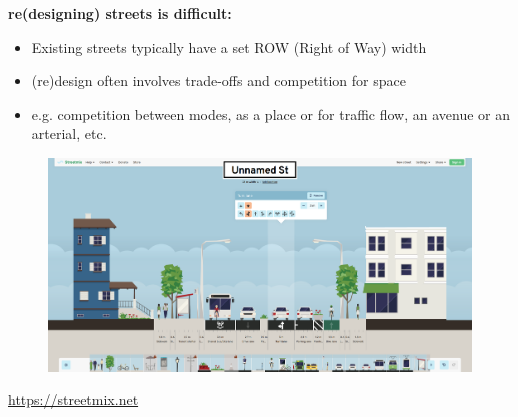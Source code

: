 \documentclass[aspectratio=169]{beamer}
\begin{document}
\begin{frame}
	
	\textbf{re(designing) streets is difficult:}
	
	\begin{itemize}
		\item Existing streets typically have a set ROW (Right of Way) width
		\item (re)design often involves trade-offs and competition for space
		\item e.g. competition between modes, as a place or for traffic flow, an avenue or an arterial, etc.
	\end{itemize}
	

	
	
	
%		
%		
%		
%		
	
	
	\begin{figure}
		\centering
		\includegraphics[width=0.85\linewidth]{images/streetmix.png}
	\end{figure}
	
	\tiny\url{https://streetmix.net}
	
\end{frame}
\end{document}
